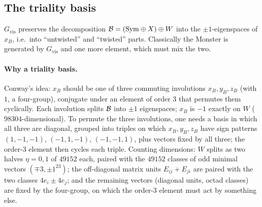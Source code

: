 \subsection{The triality basis}

$G_{\mathrm{vis}}$ preserves the decomposition $\mathcal{B}=(\mathrm{Sym}\oplus X)\oplus W$ into the
$\pm1$-eigenspaces of $x_B$, i.e.\ into ``untwisted'' and ``twisted'' parts.  Classically the Monster is
generated by $G_{\mathrm{vis}}$ and one more element, which must mix the two.

\paragraph{Why a triality basis.}  Conway's idea: $x_B$ should be one of three commuting involutions
$x_B,y_B,z_B$ (with $1$, a four-group), conjugate under an element of order $3$ that permutes them
cyclically.  Each involution splits $\mathcal{B}$ into $\pm1$
eigenspaces; $x_B$ is $-1$ exactly on $W$ ($98304$-dimensional).  To permute the three involutions, one
needs a basis in which all three are diagonal, grouped into triples on which $x_B,y_B,z_B$ have sign
patterns $(1,-1,-1)$, $(-1,1,-1)$, $(-1,-1,1)$, plus vectors fixed by all three; the order-$3$ element
then cycles each triple.  Counting dimensions: $W$ splits as two halves $\eta=0,1$ of $49152$ each,
paired with the $49152$ classes of odd minimal vectors $(\mp3,\pm1^{23})$; the off-diagonal matrix
units $E_{ij}+E_{ji}$ are paired with the two classes $4e_i\pm4e_j$; and the remaining vectors (diagonal
units, octad classes) are fixed by the four-group, on which the order-$3$ element must act by something
else.

